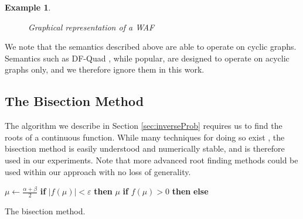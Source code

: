 \documentclass{article}
\newtheorem{example}{Example}
\begin{document}
\begin{example}
\begin{figure}
\caption{Graphical representation of a WAF}
\label{fig:ex1}
\end{figure}

\end{example}


We note that the semantics described above are able to operate on cyclic graphs. Semantics such as DF-Quad \cite{rago_discontinuity-free_2016}, while popular, are designed to operate on acyclic graphs only, and we therefore ignore them in this work.

\subsection{The Bisection Method}
The algorithm we describe in Section \ref{sec:inverseProb} requires us to find the roots of a continuous function. While many techniques for doing so exist \cite{dekker1969finding,brent2013algorithms,newton-raphson}, the bisection method is easily understood and numerically stable, and is therefore used in our experiments. 
%
Note that more advanced root finding methods could be used within our approach with no loss of generality.

\begin{algorithm}
\begin{algorithmic}
\State $\mu \gets \frac{\alpha+\beta}{2}$
\State \textbf{if} {$|f(\mu)|< \varepsilon$} \textbf{then } \Return $\mu$
\State \textbf{if} {$f(\mu)>0$} \textbf{then }\Return {}
\State \textbf{else} \Return {}
\EndFunction
\end{algorithmic}


\caption{The bisection method.}
\label{alg:bisection}
\end{algorithm}
\end{document}
